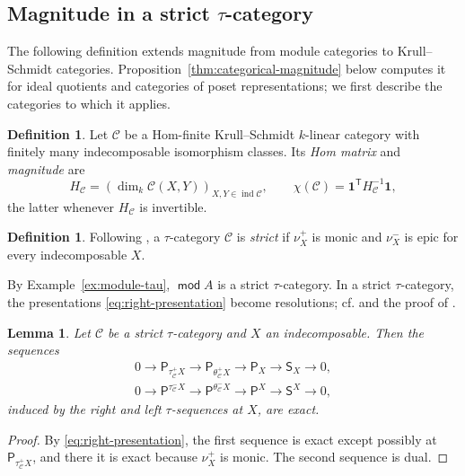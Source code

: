 \documentclass[a4paper,reqno,10pt]{amsart}
\newtheorem{lemma}[theorem]{Lemma}
\theoremstyle{definition}
\newtheorem{definition}[theorem]{Definition}
\numberwithin{equation}{section}
\DeclareMathOperator{\moduleCategory}{\mathsf{mod}}
\renewcommand{\mod}{\moduleCategory}
\DeclareMathOperator{\ind}{ind}
\newcommand{\cC}{\mathcal C}
\newcommand{\one}{\mathbf 1}
\begin{document}
\subsection{Magnitude in a strict \texorpdfstring{\(\tau\)}{tau}-category}\label{subsec:strict-magnitude}
The following definition extends magnitude from module categories to
Krull--Schmidt categories. Proposition~\ref{thm:categorical-magnitude}
below computes it for ideal quotients and categories of poset
representations; we first describe the categories to which it applies.
\begin{definition}\label{def:magnitude}
Let \(\cC\) be a Hom-finite Krull--Schmidt \(k\)-linear category
with finitely many indecomposable isomorphism classes. Its \emph{Hom
matrix} and \emph{magnitude} are
\[
 H_{\cC}=(\dim_k\cC(X,Y))_{X,Y\in\ind\cC},\qquad
 \chi(\cC)=\one^{\mathsf T}H_{\cC}^{-1}\one,
\]
the latter whenever \(H_{\cC}\) is invertible.
\end{definition}

\begin{definition}\label{def:strict-tau}
Following \cite[Section~1.3]{IyamaIV}, a \(\tau\)-category \(\cC\)
is \emph{strict} if \(\nu_X^+\) is monic and \(\nu_X^-\) is epic for every
indecomposable \(X\).
\end{definition}
By Example~\ref{ex:module-tau}, \(\mod A\) is a strict \(\tau\)-category.
In a strict \(\tau\)-category, the presentations
\eqref{eq:right-presentation} become resolutions; cf.
\cite[Section~2.1]{IyamaI} and the proof of
\cite[Theorem~4.3]{IyamaIV}.
\begin{lemma}\label{lem:strict-resolution}
Let \(\cC\) be a strict \(\tau\)-category and \(X\) an indecomposable.
Then the sequences
\[
\begin{gathered}
 0\longrightarrow\mathsf P_{\tau_{\cC}^+X}\longrightarrow
 \mathsf P_{\theta_{\cC}^+X}\longrightarrow\mathsf P_X\longrightarrow
 \mathsf S_X\longrightarrow0,\\
 0\longrightarrow\mathsf P^{\tau_{\cC}^-X}\longrightarrow
 \mathsf P^{\theta_{\cC}^-X}\longrightarrow\mathsf P^X\longrightarrow
 \mathsf S^X\longrightarrow0,
\end{gathered}
\]
induced by the right and left \(\tau\)-sequences at \(X\), are exact.
\end{lemma}
\begin{proof}
By \eqref{eq:right-presentation}, the first sequence is exact except
possibly at \(\mathsf P_{\tau_{\cC}^+X}\), and there it is exact because
\(\nu_X^+\) is monic. The second sequence is dual.
\end{proof}
\end{document}
